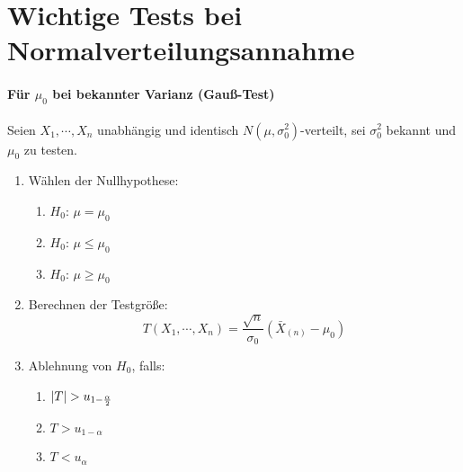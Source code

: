     \section{Wichtige Tests bei Normalverteilungsannahme}
        \paragraph{Für \(\mu_0\) bei bekannter Varianz (Gauß-Test)}
            Seien \( X_1, \cdots, X_n \) unabhängig und identisch \( N(\mu, \sigma_0^2) \)-verteilt, sei \(\sigma_0^2\) bekannt und \(\mu_0\) zu testen.
            \begin{enumerate}
            	\item Wählen der Nullhypothese:
                	\begin{enumerate}[label = \Alph*)]
                		\item \( H_0 \): \quad \( \mu = \mu_0 \)
                		\item \( H_0 \): \quad \( \mu \leq \mu_0 \)
                		\item \( H_0 \): \quad \( \mu \geq \mu_0 \)
                	\end{enumerate}
            	\item Berechnen der Testgröße:
                	\begin{equation*}
	                	T(X_1, \cdots, X_n) = \frac{\sqrt{n}}{\sigma_0} (\bar{X}_{(n)} - \mu_0)
                	\end{equation*}
	            \item Ablehnung von \(H_0\), falls:
		            \begin{enumerate}[label = \Alph*)]
		            	\item \( \abs{T} > u_{1 - \frac{\alpha}{2}} \)
		            	\item \( T > u_{1 - \alpha} \)
		            	\item \( T < u_\alpha \)
		            \end{enumerate}
            \end{enumerate}

